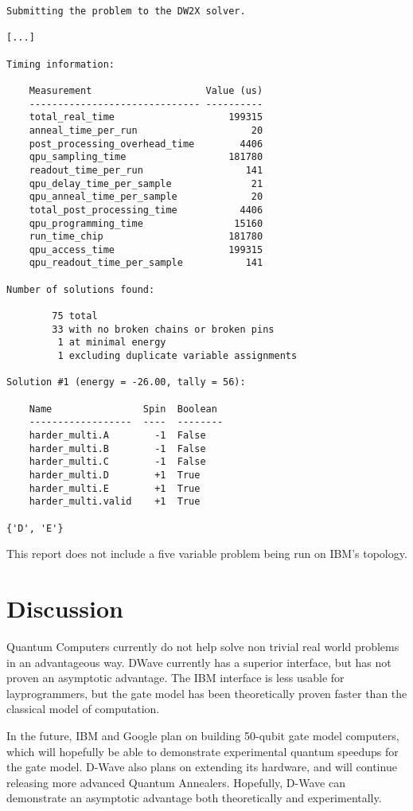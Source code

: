 \documentclass{article}
\begin{document}
\begin{verbatim}
Submitting the problem to the DW2X solver.

[...]

Timing information:

    Measurement                    Value (us)
    ------------------------------ ----------
    total_real_time                    199315
    anneal_time_per_run                    20
    post_processing_overhead_time        4406
    qpu_sampling_time                  181780
    readout_time_per_run                  141
    qpu_delay_time_per_sample              21
    qpu_anneal_time_per_sample             20
    total_post_processing_time           4406
    qpu_programming_time                15160
    run_time_chip                      181780
    qpu_access_time                    199315
    qpu_readout_time_per_sample           141

Number of solutions found:

        75 total
        33 with no broken chains or broken pins
         1 at minimal energy
         1 excluding duplicate variable assignments

Solution #1 (energy = -26.00, tally = 56):

    Name                Spin  Boolean
    ------------------  ----  --------
    harder_multi.A        -1  False  
    harder_multi.B        -1  False  
    harder_multi.C        -1  False  
    harder_multi.D        +1  True   
    harder_multi.E        +1  True   
    harder_multi.valid    +1  True    

{'D', 'E'}
\end{verbatim}

This report does not include a five variable problem being run on IBM's topology.

\section{Discussion}

Quantum Computers currently do not help solve non trivial real world problems in an advantageous way.
DWave currently has a superior interface, but has not proven an asymptotic advantage.
The IBM interface is less usable for layprogrammers, but the gate model has been theoretically proven faster than the classical model of computation. 

In the future, IBM and Google plan on building 50-qubit gate model computers, which will hopefully be able to demonstrate experimental quantum speedups for the gate model.
D-Wave also plans on extending its hardware, and will continue releasing more advanced Quantum Annealers.
Hopefully, D-Wave can demonstrate an asymptotic advantage both theoretically and experimentally.
\end{document}

